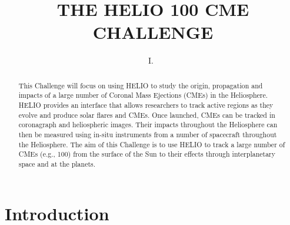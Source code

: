 \documentclass[namedreferences]{SolarPhysics}
\begin{document}
\begin{article}

\begin{opening}

\title{THE HELIO 100 CME CHALLENGE}

%
\author{I.~\surname{}%
       }

%


%


\begin{abstract}

This Challenge will focus on using HELIO to study the origin, propagation and impacts of a large number of Coronal Mass Ejections (CMEs) in the Heliosphere. HELIO provides an interface that allows researchers to track active regions as they evolve and produce solar flares and CMEs. Once launched, CMEs can be tracked in coronagraph and heliospheric images. Their impacts throughout the Heliosphere can then be measured using in-situ instruments from a number of spacecraft throughout the Heliosphere. The aim of this Challenge is to use HELIO to track a large number of CMEs (e.g., 100) from the surface of the Sun to their effects through interplanetary space and at the planets.

\end{abstract}



%


\end{opening}

%
\section{Introduction}


\end{article}
\end{document}
